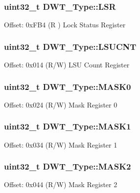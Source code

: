 \subsubsection[{\texorpdfstring{L\+SR}{LSR}}]{ uint32\+\_\+t D\+W\+T\+\_\+\+Type\+::\+L\+SR}\hypertarget{structDWT__Type_a28449e73e4c03e372c9ee0bb1211a58a}{}\label{structDWT__Type_a28449e73e4c03e372c9ee0bb1211a58a}
Offset\+: 0x\+F\+B4 (R ) Lock Status Register 
\subsubsection[{\texorpdfstring{L\+S\+U\+C\+NT}{LSUCNT}}]{ uint32\+\_\+t D\+W\+T\+\_\+\+Type\+::\+L\+S\+U\+C\+NT}\hypertarget{structDWT__Type_aeba92e6c7fd3de4ba06bfd94f47f5b35}{}\label{structDWT__Type_aeba92e6c7fd3de4ba06bfd94f47f5b35}
Offset\+: 0x014 (R/W) L\+SU Count Register 
\subsubsection[{\texorpdfstring{M\+A\+S\+K0}{MASK0}}]{ uint32\+\_\+t D\+W\+T\+\_\+\+Type\+::\+M\+A\+S\+K0}\hypertarget{structDWT__Type_a5bb1c17fc754180cc197b874d3d8673f}{}\label{structDWT__Type_a5bb1c17fc754180cc197b874d3d8673f}
Offset\+: 0x024 (R/W) Mask Register 0 
\subsubsection[{\texorpdfstring{M\+A\+S\+K1}{MASK1}}]{ uint32\+\_\+t D\+W\+T\+\_\+\+Type\+::\+M\+A\+S\+K1}\hypertarget{structDWT__Type_a0c684438a24f8c927e6e01c0e0a605ef}{}\label{structDWT__Type_a0c684438a24f8c927e6e01c0e0a605ef}
Offset\+: 0x034 (R/W) Mask Register 1 
\subsubsection[{\texorpdfstring{M\+A\+S\+K2}{MASK2}}]{ uint32\+\_\+t D\+W\+T\+\_\+\+Type\+::\+M\+A\+S\+K2}\hypertarget{structDWT__Type_a8ecdc8f0d917dac86b0373532a1c0e2e}{}\label{structDWT__Type_a8ecdc8f0d917dac86b0373532a1c0e2e}
Offset\+: 0x044 (R/W) Mask Register 2 
